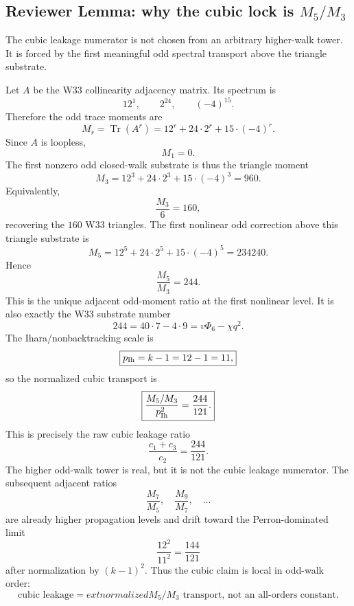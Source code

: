 
\subsection{Reviewer Lemma: why the cubic lock is $M_5/M_3$}\label{subsec:cubic-lock-reviewer-lemma}

The cubic leakage numerator is not chosen from an arbitrary higher-walk tower.  It is forced by the first meaningful odd spectral transport above the triangle substrate.

Let $A$ be the W33 collinearity adjacency matrix.  Its spectrum is
\[
12^1,\qquad 2^{24},\qquad (-4)^{15}.
\]
Therefore the odd trace moments are
\[
M_r=\operatorname{Tr}(A^r)=12^r+24\cdot 2^r+15\cdot(-4)^r.
\]
Since $A$ is loopless,
\[
M_1=0.
\]
The first nonzero odd closed-walk substrate is thus the triangle moment
\[
M_3=12^3+24\cdot2^3+15\cdot(-4)^3=960.
\]
Equivalently,
\[
\frac{M_3}{6}=160,
\]
recovering the $160$ W33 triangles.  The first nonlinear odd correction above this triangle substrate is
\[
M_5=12^5+24\cdot2^5+15\cdot(-4)^5=234240.
\]
Hence
\[
\boxed{
\frac{M_5}{M_3}=244.
}
\]
This is the unique adjacent odd-moment ratio at the first nonlinear level.  It is also exactly the W33 substrate number
\[
\boxed{
244=40\cdot7-4\cdot9=v\Phi_6-\chi q^2.
}
\]
The Ihara/nonbacktracking scale is
\[
\boxed{
p_{\rm Ih}=k-1=12-1=11,
}
\]
so the normalized cubic transport is
\[
\boxed{
\frac{M_5/M_3}{p_{\rm Ih}^2}
=
\frac{244}{121}.
}
\]
This is precisely the raw cubic leakage ratio
\[
\boxed{
\frac{c_1+c_3}{c_2}=\frac{244}{121}.
}
\]
The higher odd-walk tower is real, but it is not the cubic leakage numerator.  The subsequent adjacent ratios
\[
\frac{M_7}{M_5},\quad \frac{M_9}{M_7},\quad \dots
\]
are already higher propagation levels and drift toward the Perron-dominated limit
\[
\boxed{
\frac{12^2}{11^2}=\frac{144}{121}
}
\]
after normalization by $(k-1)^2$.  Thus the cubic claim is local in odd-walk order:
\[
\boxed{
\text{cubic leakage}=	ext{normalized }M_5/M_3\text{ transport, not an all-orders constant.}
}
\]
